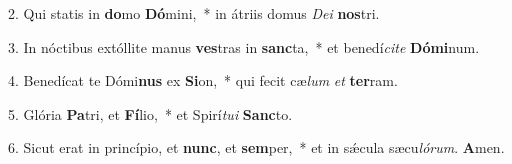 2. Qui statis in \textbf{do}mo \textbf{Dó}mini,~*  in átriis domus \textit{De}\textit{i} \textbf{nos}tri.\

3. In nóctibus extóllite manus \textbf{ves}tras in \textbf{sanc}ta,~*  et benedí\textit{ci}\textit{te} \textbf{Dó}\textbf{mi}num.\

4. Benedícat te Dómi\textbf{nus} ex \textbf{Si}on,~*  qui fecit cæ\textit{lum} \textit{et} \textbf{ter}ram.\

5. Glória \textbf{Pa}tri, et \textbf{Fí}lio,~*  et Spirí\textit{tu}\textit{i} \textbf{Sanc}to.\

6. Sicut erat in princípio, et \textbf{nunc}, et \textbf{sem}per,~*  et in sǽcula sæcu\textit{ló}\textit{rum}. \textbf{A}men.\

